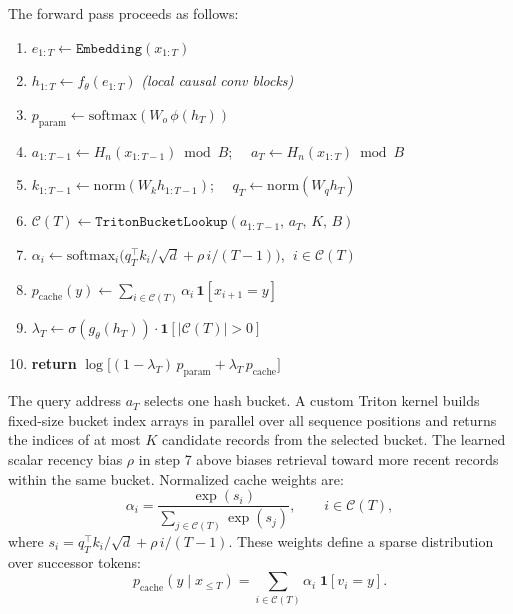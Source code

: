 \documentclass[11pt]{article}
\begin{document}
\noindent\begin{minipage}{\linewidth}
The forward pass proceeds as follows:
\begin{enumerate}
  \item $e_{1:T} \leftarrow \texttt{Embedding}(x_{1:T})$
  \item $h_{1:T} \leftarrow f_\theta(e_{1:T})$ \hfill\textit{(local causal conv blocks)}
  \item $p_{\mathrm{param}} \leftarrow \mathrm{softmax}(W_o\,\phi(h_T))$
  \item $a_{1:T-1} \leftarrow H_n(x_{1:T-1}) \bmod B$; $\quad a_T \leftarrow H_n(x_{1:T}) \bmod B$
  \item $k_{1:T-1} \leftarrow \mathrm{norm}(W_k h_{1:T-1})$; $\quad q_T \leftarrow \mathrm{norm}(W_q h_T)$
  \item $\mathcal{C}(T) \leftarrow \texttt{TritonBucketLookup}(a_{1:T-1},\,a_T,\,K,\,B)$
  \item $\alpha_i \leftarrow \mathrm{softmax}_i\!\bigl(q_T^\top k_i / {\sqrt{d}} + \rho\,i/(T{-}1)\bigr)$, $\;i\in\mathcal{C}(T)$
  \item $p_{\mathrm{cache}}(y) \leftarrow \sum_{i \in \mathcal{C}(T)} \alpha_i\,\mathbf{1}[x_{i+1}=y]$
  \item $\lambda_T \leftarrow \sigma(g_\theta(h_T))\cdot\mathbf{1}[\lvert\mathcal{C}(T)\rvert>0]$
  \item \textbf{return} $\log\!\bigl[(1-\lambda_T)\,p_{\mathrm{param}} + \lambda_T\,p_{\mathrm{cache}}\bigr]$
\end{enumerate}
\end{minipage}

The query address $a_T$ selects one hash bucket. A custom Triton kernel builds
fixed-size bucket index arrays in parallel over all sequence positions and
returns the indices of at most $K$ candidate records from the selected bucket.
The learned scalar recency bias $\rho$ in step 7 above biases retrieval toward
more recent records within the same bucket. Normalized cache weights are:
\begin{equation}
  \alpha_i =
  \frac{\exp(s_i)}{\sum_{j \in \mathcal{C}(T)} \exp(s_j)},
  \qquad i \in \mathcal{C}(T),
\end{equation}
where $s_i = q_T^\top k_i / \sqrt{d} + \rho\, i/(T-1)$.
These weights define a sparse distribution over successor tokens:
\begin{equation}
  p_{\mathrm{cache}}(y \mid x_{\leq T})
  = \sum_{i \in \mathcal{C}(T)} \alpha_i \;\mathbf{1}[v_i = y].
  \label{eq:cache-dist}
\end{equation}
\end{document}
